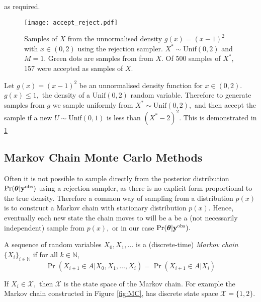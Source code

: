 as required.

\begin{figure}
    \centering
    \texttt{[image: accept\_reject.pdf]}
    \caption{
        Samples of $X$ from the unnormalised density $g(x) = (x - 1)^2$ with
        $x\in(0,2)$ using the rejection sampler. $X^\ast\sim\mathrm{Unif}(0,2)$
        and $M = 1.$
        Green dots are samples from
        from $X.$
        Of 500 samples of $X^\ast$, 157 were accepted as samples of $X$.
    }
    \label{fig:accept_reject}
\end{figure}

\begin{example}
    Let $g(x) = (x - 1)^2$ be an unnormalised density function for
    $x \in (0,2).$ $g(x) \leq 1,$ the density of a $\mathrm{Unif}(0,2)$ random
    variable. Therefore to generate samples from $g$ we sample uniformly from
    $X^\ast \sim \mathrm{Unif}(0, 2),$ and then accept the sample if a new
    $U \sim \mathrm{Unif}(0, 1)$ is less than $(X^\ast - 2)^2.$ This is
    demonstrated in \ref{fig:accept_reject}
\end{example}

\subsection*{Markov Chain Monte Carlo Methods}

Often it is not possible to sample directly from the posterior distribution
$\Pr(\bm{\theta}|\mathbf{y}^{\mathrm{obs}})$ using a rejection sampler, as there is no
explicit form proportional to the true density.
Therefore a common way of sampling from a distribution $p(x)$ is
to construct a Markov chain with stationary distribution $p(x).$
Hence, eventually each new state the
chain moves to will be a be a (not necessarily independent) sample from $p(x),$
or in our case $\Pr(\bm{\theta}|\mathbf{y}^{\mathrm{obs}}).$

\begin{definition}
    A sequence of random variables
    $X_0, X_1, \dots$
    is a (discrete-time) \emph{Markov chain} $\{X_i\}_{i\in\mathbb{N}}$ if for
    all
    $k\in\mathbb{N}$,
    $$
        \Pr(X_{i+1}\in A|X_0, X_1, \dots, X_i)
        = \Pr(X_{i+1}\in A|X_i)
    $$
\end{definition}

If $X_i\in\mathcal{X},$ then $\mathcal{X}$ is the state space of the Markov
chain. For example the Markov chain constructed in Figure \ref{fig:MC}, has
discrete state space $\mathcal{X} = \{1, 2\}.$

